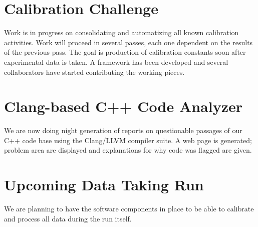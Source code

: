 \documentclass[12pt]{article}
\begin{document}
\section{Calibration Challenge}

Work is in progress on consolidating and automatizing all known
calibration activities. Work will proceed in several passes, each one
dependent on the results of the previous pass. The goal is production
of calibration constants soon after experimental data is taken. A
framework has been developed and several collaborators have started
contributing the working pieces.

\section{Clang-based C++ Code Analyzer}

We are now doing night generation of reports on questionable passages
of our C++ code base using the Clang/LLVM compiler suite. A web page
is generated; problem area are displayed and explanations for why code
was flagged are given.

\section{Upcoming Data Taking Run}

We are planning to have the software components in place to be able to calibrate and process all data during the run itself.
\end{document}
